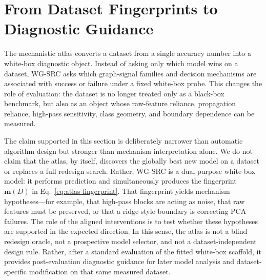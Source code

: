 \documentclass{article}
\newcommand{\SRC}{\textsc{WG-SRC}}
\begin{document}
\section{From Dataset Fingerprints to Diagnostic Guidance}

\label{sec:atlas-diagnostic-probe}

The mechanistic atlas converts a dataset from a single accuracy number into a
white-box diagnostic object. Instead of asking only which model wins on a
dataset, WG-SRC asks which graph-signal families and decision mechanisms are
associated with success or failure under a fixed white-box probe. This changes
the role of evaluation: the dataset is no longer treated only as a black-box
benchmark, but also as an object whose raw-feature reliance, propagation
reliance, high-pass sensitivity, class geometry, and boundary dependence can be
measured.

The claim supported in this section is deliberately narrower than automatic
algorithm design but stronger than mechanism interpretation alone. We do not
claim that the atlas, by itself, discovers the globally best new model on a
dataset or replaces a full redesign search. Rather, \SRC{} is a dual-purpose
white-box model: it performs prediction and simultaneously produces the
fingerprint $\mathbf{m}(D)$ in Eq.~\eqref{eq:atlas-fingerprint}. That
fingerprint yields mechanism hypotheses---for example, that high-pass blocks
are acting as noise, that raw features must be preserved, or that a
ridge-style boundary is correcting PCA failures. The role of the aligned interventions is to test whether these hypotheses are
supported in the expected direction. In this sense, the atlas is not a blind
redesign oracle, not a prospective model selector, and not a
dataset-independent design rule. Rather, after a standard evaluation of the
fitted white-box scaffold, it provides post-evaluation diagnostic guidance for
later model analysis and dataset-specific modification on that same measured
dataset.
\end{document}
